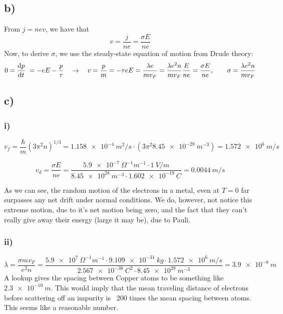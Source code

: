 \documentclass[12p,a4paper]{article}
\begin{document}
\subsection*{b)}
From $j=nev$, we have that
\[
    v = \frac{j}{ne} = \frac{\sigma E}{ne}
\]
Now, to derive $\sigma$, we use the steady-state equation of motion from Drude theory:
\[
    0 = \dv{p}{t} = -eE - \frac{p}{\tau} \quad\rightarrow\quad v = \frac{p}{m} = -\tau e E = \frac{\lambda e}{m v_F} = \frac{\lambda e^2 n}{m v_F} \frac{E}{ne} = \frac{\sigma E}{ne}, \quad\quad \sigma = \frac{\lambda e^2 n}{m v_F}
\]



\subsection*{c)}
\subsubsection*{i)}
\[
    v_f = \frac{\hbar}{m}(3\pi^2 n)^{1/3} = \SI{1.158e-4}{m^2/s}\cdot (3\pi^2 \SI{8.45e-28}{m^{-3}}) = \SI{1.572e6}{m/s}
\]

\[
    v_d = \frac{\sigma E}{n e} = \frac{\SI{5.9e-7}{\Omega^{-1}m^{-1}}\cdot \SI{1}{V/m}}{\SI{8.45e28}{m^{-3}}\cdot \SI{1.602e-19}{C}} = \SI{0.0044}{m/s}
\]

As we can see, the random motion of the electrons in a metal, even at $T=0$ far surpasses any net drift under normal conditions. We do, however, not notice this extreme motion, due to it's net motion being zero, and the fact that they can't really give away their energy (large it may be), due to Pauli.


\subsubsection*{ii)}
\[
    \lambda = \frac{\sigma m v_F}{e^2 n} = \frac{\SI{5.9e7}{\Omega^{-1}m^{-1}} \cdot \SI{9.109e-31}{kg} \cdot \SI{1.572e6}{m/s}}{\SI{2.567e-38}{C^2}\cdot \SI{8.45e28}{m^{-3}}} = \SI{3.9e-8}{m}
\]
A lookup gives the spacing between Copper atoms to be something like $\SI{2.3e-10}{m}$. This would imply that the mean traveling distance of electrons before scattering off an impurity is ~200 times the mean spacing between atoms. This seems like a reasonable number.
\end{document}
